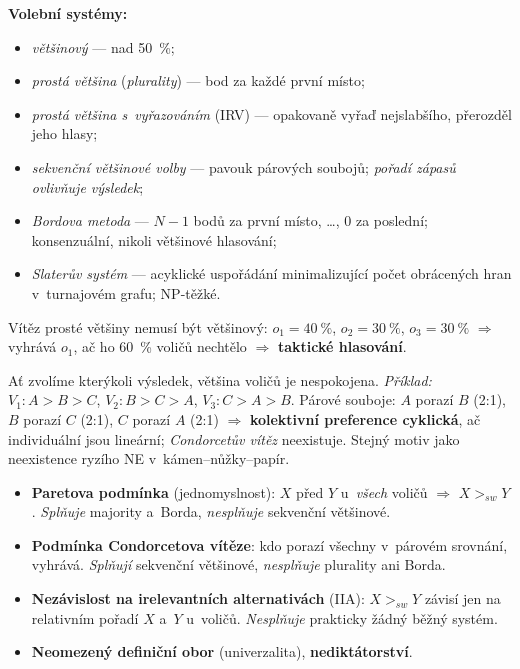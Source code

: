 \documentclass[11pt,a4paper]{article}
\theoremstyle{definition}
\begin{document}
\textbf{Volební systémy:}
\begin{itemize}
\item \emph{většinový} --- nad 50~\%;
\item \emph{prostá většina} (\emph{plurality}) --- bod za každé první místo;
\item \emph{prostá většina s~vyřazováním} (IRV) --- opakovaně vyřaď nejslabšího, přerozděl jeho
  hlasy;
\item \emph{sekvenční většinové volby} --- pavouk párových soubojů; \emph{pořadí zápasů
  ovlivňuje výsledek};
\item \emph{Bordova metoda} --- $N-1$ bodů za první místo, \dots, $0$ za poslední; konsenzuální,
  nikoli většinové hlasování;
\item \emph{Slaterův systém} --- acyklické uspořádání minimalizující počet obrácených hran
  v~turnajovém grafu; NP-těžké.
\end{itemize}
Vítěz prosté většiny nemusí být většinový: $o_1 = 40~\%$, $o_2 = 30~\%$, $o_3 = 30~\%$
$\Rightarrow$ vyhrává $o_1$, ač ho 60~\% voličů nechtělo $\Rightarrow$ \textbf{taktické
hlasování}.

\begin{defbox}
Ať zvolíme kterýkoli výsledek, většina voličů je nespokojena.
\emph{Příklad:} $V_1: A > B > C$, \quad $V_2: B > C > A$, \quad $V_3: C > A > B$.
Párové souboje: $A$ porazí $B$ (2:1), $B$ porazí $C$ (2:1), $C$ porazí $A$ (2:1) $\Rightarrow$
\textbf{kolektivní preference cyklická}, ač individuální jsou lineární; \emph{Condorcetův vítěz}
neexistuje. Stejný motiv jako neexistence ryzího NE v~kámen--nůžky--papír.
\end{defbox}

\begin{defbox}
\begin{itemize}
\item \textbf{Paretova podmínka} (jednomyslnost): $X$ před $Y$ u~\emph{všech} voličů
  $\Rightarrow$ $X >_{sw} Y$. \emph{Splňuje} majority a~Borda, \emph{nesplňuje} sekvenční
  většinové.
\item \textbf{Podmínka Condorcetova vítěze}: kdo porazí všechny v~párovém srovnání, vyhrává.
  \emph{Splňují} sekvenční většinové, \emph{nesplňuje} plurality ani Borda.
\item \textbf{Nezávislost na irelevantních alternativách} (IIA): $X >_{sw} Y$ závisí jen na
  relativním pořadí $X$ a~$Y$ u~voličů. \emph{Nesplňuje} prakticky žádný běžný systém.
\item \textbf{Neomezený definiční obor} (univerzalita), \textbf{nediktátorství}.
\end{itemize}
\end{defbox}
\end{document}
